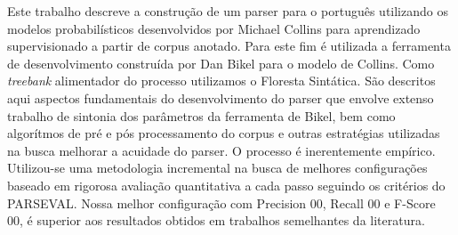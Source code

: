 \documentclass[a4paper]{abnt}
\begin{document}


\pagestyle{plain}


\begin{resumo}





Este trabalho descreve a construção de um parser para o português utilizando os modelos probabilísticos desenvolvidos por Michael Collins para aprendizado supervisionado a partir de corpus anotado. 
Para este fim é utilizada a ferramenta de desenvolvimento construída por Dan Bikel para o modelo de Collins. 
Como \emph{treebank} alimentador do processo utilizamos o Floresta Sintática.
São descritos aqui aspectos fundamentais do desenvolvimento do parser que envolve extenso trabalho de sintonia dos parâmetros da ferramenta de Bikel, bem como algorítmos de pré e pós processamento do corpus e outras estratégias utilizadas na busca melhorar a acuidade do parser. 
O processo é inerentemente empírico. Utilizou-se uma metodologia incremental na busca de melhores configurações baseado em rigorosa avaliação quantitativa a cada passo seguindo os critérios do PARSEVAL. 
Nossa melhor configuração com Precision 00, Recall 00 e F-Score 00, é superior aos resultados obtidos em trabalhos semelhantes da literatura.

\end{resumo}





\end{document}

